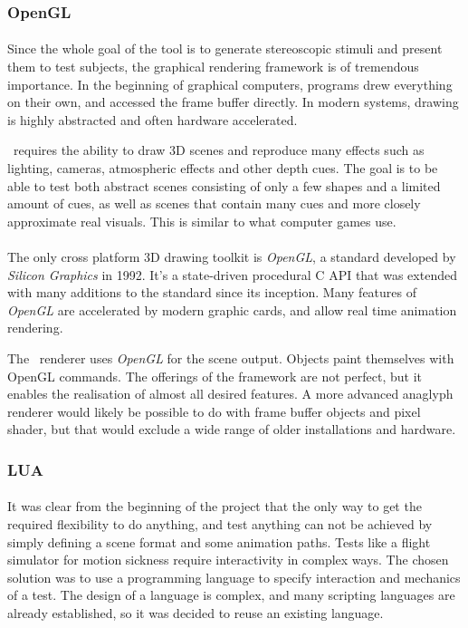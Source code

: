 \subsubsection{OpenGL\label{FrameworkOpenGL}}
\paragraph{}
Since the whole goal of the tool is to generate stereoscopic stimuli and present them to test subjects,
the graphical rendering framework is of tremendous importance.
In the beginning of graphical computers, programs drew everything on their own, and accessed the frame buffer directly.
In modern systems, drawing is highly abstracted and often hardware accelerated.

\ER\ requires the ability to draw 3D scenes and reproduce many effects such as lighting, cameras, atmospheric effects and other depth cues.
The goal is to be able to test both abstract scenes consisting of only a few shapes and a limited amount of cues,
as well as scenes that contain many cues and more closely approximate real visuals.
This is similar to what computer games use.

\paragraph{}
The only cross platform 3D drawing toolkit is \textit{OpenGL}\cite{opengl}, a standard developed by \textit{Silicon Graphics} in 1992.
It's a state-driven procedural C API that was extended with many additions to the standard since its inception.
Many features of \textit{OpenGL} are accelerated by modern graphic cards, and allow real time animation rendering.

The \ER\ renderer uses \textit{OpenGL} for the scene output.
Objects paint themselves with OpenGL commands.
The offerings of the framework are not perfect, but it enables the realisation of almost all desired features.
A more advanced anaglyph renderer would likely be possible to do with frame buffer objects and pixel shader, but that would exclude a wide range of older installations and hardware.


\subsubsection{LUA\label{FrameworkLua}}
\paragraph{}
It was clear from the beginning of the project that the only way to get the required flexibility to do anything, and test anything can not be achieved by simply defining a scene format and some animation paths.
Tests like a flight simulator for motion sickness require interactivity in complex ways.
The chosen solution was to use a programming language to specify interaction and mechanics of a test.
The design of a language is complex, and many scripting languages are already established, so it was decided to reuse an existing language.

